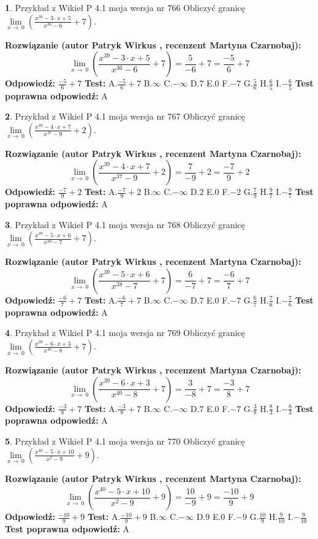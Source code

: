 \documentclass[12pt, a4paper]{article}
\theoremstyle{definition} %
\newtheorem{zad}{}
\newcommand{\zadStart}[1]{\begin{zad}#1\newline}
\newcommand{\zadStop}{\end{zad}}
\newcommand{\rozwStart}[2]{\noindent \textbf{Rozwiązanie (autor #1 , recenzent #2): }\newline}
\newcommand{\rozwStop}{\newline}
\newcommand{\odpStart}{\noindent \textbf{Odpowiedź:}\newline}
\newcommand{\odpStop}{\newline}
\newcommand{\testStart}{\noindent \textbf{Test:}\newline}
\newcommand{\testStop}{\newline}
\newcommand{\kluczStart}{\noindent \textbf{Test poprawna odpowiedź:}\newline}
\newcommand{\kluczStop}{\newline}
\begin{document}
\zadStart{Przykład z Wikieł P 4.1 moja wersja nr 766}
Obliczyć granicę $\lim\limits_{x\to\ 0}(\frac{x^{39}-3 \cdot x +5}{x^{36}-6}+7)$.
\zadStop
\rozwStart{Patryk Wirkus}{Martyna Czarnobaj}
$$\lim\limits_{x\to\ 0}(\frac{x^{39}-3 \cdot x +5}{x^{36}-6}+7)=\frac{5}{-6}+7=\frac{-5}{6}+7$$
\rozwStop
\odpStart
$\frac{-5}{6}+7$
\odpStop
\testStart
A.$\frac{-5}{6}+7$
B.$\infty$
C.$-\infty$
D.$7$
E.$0$
F.$-7$
G.$\frac{5}{6}$
H.$\frac{6}{5}$
I.$-\frac{6}{5}$
\testStop
\kluczStart
A
\kluczStop



\zadStart{Przykład z Wikieł P 4.1 moja wersja nr 767}
Obliczyć granicę $\lim\limits_{x\to\ 0}(\frac{x^{39}-4 \cdot x +7}{x^{37}-9}+2)$.
\zadStop
\rozwStart{Patryk Wirkus}{Martyna Czarnobaj}
$$\lim\limits_{x\to\ 0}(\frac{x^{39}-4 \cdot x +7}{x^{37}-9}+2)=\frac{7}{-9}+2=\frac{-7}{9}+2$$
\rozwStop
\odpStart
$\frac{-7}{9}+2$
\odpStop
\testStart
A.$\frac{-7}{9}+2$
B.$\infty$
C.$-\infty$
D.$2$
E.$0$
F.$-2$
G.$\frac{7}{9}$
H.$\frac{9}{7}$
I.$-\frac{9}{7}$
\testStop
\kluczStart
A
\kluczStop



\zadStart{Przykład z Wikieł P 4.1 moja wersja nr 768}
Obliczyć granicę $\lim\limits_{x\to\ 0}(\frac{x^{39}-5 \cdot x +6}{x^{38}-7}+7)$.
\zadStop
\rozwStart{Patryk Wirkus}{Martyna Czarnobaj}
$$\lim\limits_{x\to\ 0}(\frac{x^{39}-5 \cdot x +6}{x^{38}-7}+7)=\frac{6}{-7}+7=\frac{-6}{7}+7$$
\rozwStop
\odpStart
$\frac{-6}{7}+7$
\odpStop
\testStart
A.$\frac{-6}{7}+7$
B.$\infty$
C.$-\infty$
D.$7$
E.$0$
F.$-7$
G.$\frac{6}{7}$
H.$\frac{7}{6}$
I.$-\frac{7}{6}$
\testStop
\kluczStart
A
\kluczStop



\zadStart{Przykład z Wikieł P 4.1 moja wersja nr 769}
Obliczyć granicę $\lim\limits_{x\to\ 0}(\frac{x^{39}-6 \cdot x +3}{x^{40}-8}+7)$.
\zadStop
\rozwStart{Patryk Wirkus}{Martyna Czarnobaj}
$$\lim\limits_{x\to\ 0}(\frac{x^{39}-6 \cdot x +3}{x^{40}-8}+7)=\frac{3}{-8}+7=\frac{-3}{8}+7$$
\rozwStop
\odpStart
$\frac{-3}{8}+7$
\odpStop
\testStart
A.$\frac{-3}{8}+7$
B.$\infty$
C.$-\infty$
D.$7$
E.$0$
F.$-7$
G.$\frac{3}{8}$
H.$\frac{8}{3}$
I.$-\frac{8}{3}$
\testStop
\kluczStart
A
\kluczStop



\zadStart{Przykład z Wikieł P 4.1 moja wersja nr 770}
Obliczyć granicę $\lim\limits_{x\to\ 0}(\frac{x^{40}-5 \cdot x +10}{x^{2}-9}+9)$.
\zadStop
\rozwStart{Patryk Wirkus}{Martyna Czarnobaj}
$$\lim\limits_{x\to\ 0}(\frac{x^{40}-5 \cdot x +10}{x^{2}-9}+9)=\frac{10}{-9}+9=\frac{-10}{9}+9$$
\rozwStop
\odpStart
$\frac{-10}{9}+9$
\odpStop
\testStart
A.$\frac{-10}{9}+9$
B.$\infty$
C.$-\infty$
D.$9$
E.$0$
F.$-9$
G.$\frac{10}{9}$
H.$\frac{9}{10}$
I.$-\frac{9}{10}$
\testStop
\kluczStart
A
\kluczStop
\end{document}
